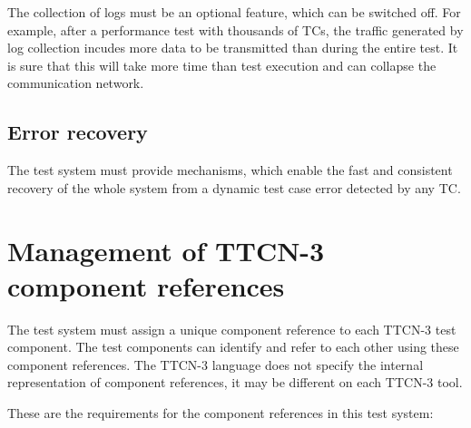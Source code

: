 \documentclass[a4paper,10pt]{article}
\begin{document}
The collection of logs must be an optional feature, which can be switched off. For example, after a performance test with thousands of TCs, the traffic generated by log collection incudes more data to be transmitted than during the entire test. It is sure that this will take more time than test execution and can collapse the communication network.

\subsection{Error recovery}

The test system must provide mechanisms, which enable the fast and consistent recovery of the whole system from a dynamic test case error detected by any TC.

\section{Management of TTCN-3 component references}

The test system must assign a unique component reference to each TTCN-3 test component. The test components can identify and refer to each other using these component references. The TTCN-3 language does not specify the internal representation of component references, it may be different on each TTCN-3 tool.

These are the requirements for the component references in this test system:
\end{document}
